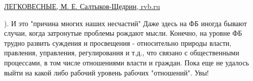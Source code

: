 \begin{itemize}
\href{https://rvb.ru/saltykov-shchedrin/01text/vol_07/01text/0189.htm}{%
ЛЕГКОВЕСНЫЕ, М. Е. Салтыков-Щедрин, rvb.ru%
}

). И это "причина многих наших несчастий" Даже здесь на ФБ иногда бывают
случаи, когда затронутые проблемы рождают мысли. Конечно, на уровне ФБ трудно
развить суждения и просвещения - относительно природы власти, правления,
управления, регулирования и т.д., что связано с общественными процессами, в том
числе отношениями власти и граждан. Пока еще не удалось выйти на какой либо
рабочий уровень рабочих "отношений". Увы!

\end{itemize} %
